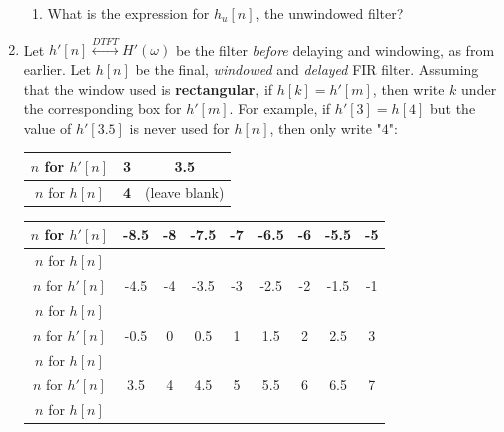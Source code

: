 \documentclass{article}
\begin{document}
\begin{enumerate}
\begin{enumerate}
        \item What is the expression for $h_u[n]$, the unwindowed filter? \vspace{2cm}
    \end{enumerate}
    \item Let $h'[n] \overset{DTFT}{\longleftrightarrow} H'(\omega)$ be the filter \textit{before} delaying and windowing, as from earlier. Let $h[n]$ be the final, \textit{windowed} and \textit{delayed} FIR filter. Assuming that the window used is \textbf{rectangular}, if $h[k]=h'[m]$, then write $k$ under the corresponding box for $h'[m]$. For example, if $h'[3]=h[4]$ but the value of $h'[3.5]$ is never used for $h[n]$, then only write "$4$":
    \begin{center}
        \begin{tabular}{|c|c|c|}
             \hline
             $n$ for $h'[n]$ & 3 & 3.5 \\
             \hline
             $n$ for $h[n]$ & \textbf{4} & (leave blank) \\
             \hline
        \end{tabular}
    \end{center}
\begin{center}
    \begin{tabular}{|c|c|c|c|c|c|c|c|c|}
         \hline
        $n$ for $h'[n]$ & -8.5 & -8 & -7.5 & -7 & -6.5 & -6 & -5.5 & -5 \\
        \hline
        $n$ for $h[n]$ &  &  &  &  &  & & &   \\
        \hline
        $n$ for $h'[n]$ & -4.5 & -4 & -3.5 & -3 & -2.5 & -2 & -1.5 & -1 \\
        \hline
        $n$ for $h[n]$ &  &  &  &  &  & & &   \\
        \hline
        $n$ for $h'[n]$ & -0.5 & 0 & 0.5 & 1 & 1.5 & 2 & 2.5 & 3 \\
        \hline
        $n$ for $h[n]$  &  &  &  &  &  & & &\\
        \hline
        $n$ for $h'[n]$ & 3.5 & 4 & 4.5 & 5 & 5.5 & 6 & 6.5 & 7 \\
        \hline
        $n$ for $h[n]$  &  &  &  &  &  & & &\\
        \hline
    \end{tabular}
\end{center}
\hspace{10mm}
    
\end{enumerate}

\newpage
\end{document}

